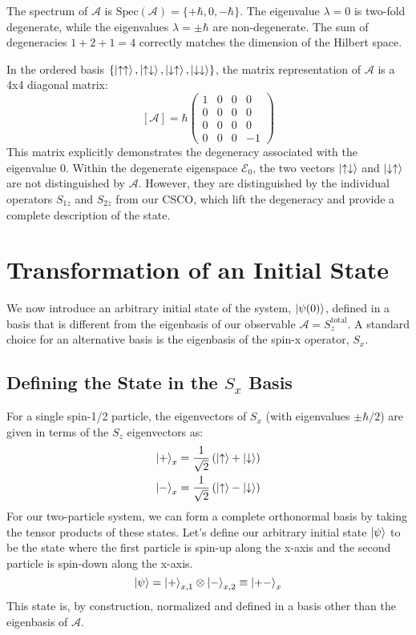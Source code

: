 \documentclass[11pt,a4paper]{article}
\begin{document}
The spectrum of $\mathcal{A}$ is $\text{Spec}(\mathcal{A}) = \{+\hbar, 0, -\hbar\}$. The eigenvalue $\lambda=0$ is two-fold degenerate, while the eigenvalues $\lambda=\pm\hbar$ are non-degenerate. The sum of degeneracies $1+2+1=4$ correctly matches the dimension of the Hilbert space.

In the ordered basis $\{\ket{\uparrow\uparrow}, \ket{\uparrow\downarrow}, \ket{\downarrow\uparrow}, \ket{\downarrow\downarrow}\}$, the matrix representation of $\mathcal{A}$ is a 4x4 diagonal matrix:
$$
[\mathcal{A}] = \hbar
\begin{pmatrix}
 1 & 0 & 0 & 0 \\
 0 & 0 & 0 & 0 \\
 0 & 0 & 0 & 0 \\
 0 & 0 & 0 & -1
\end{pmatrix}
$$
This matrix explicitly demonstrates the degeneracy associated with the eigenvalue 0. Within the degenerate eigenspace $\mathcal{E}_0$, the two vectors $\ket{\uparrow\downarrow}$ and $\ket{\downarrow\uparrow}$ are not distinguished by $\mathcal{A}$. However, they are distinguished by the individual operators $S_{1z}$ and $S_{2z}$ from our CSCO, which lift the degeneracy and provide a complete description of the state.

\section{Transformation of an Initial State}

We now introduce an arbitrary initial state of the system, $\ket{\psi(0)}$, defined in a basis that is different from the eigenbasis of our observable $\mathcal{A} = S_{z}^{\text{total}}$. A standard choice for an alternative basis is the eigenbasis of the spin-x operator, $S_x$.

\subsection{Defining the State in the $S_x$ Basis}

For a single spin-1/2 particle, the eigenvectors of $S_x$ (with eigenvalues $\pm\hbar/2$) are given in terms of the $S_z$ eigenvectors as:
\begin{align}
    \ket{+}_x &= \frac{1}{\sqrt{2}} \left( \ket{\uparrow} + \ket{\downarrow} \right) \\
    \ket{-}_x &= \frac{1}{\sqrt{2}} \left( \ket{\uparrow} - \ket{\downarrow} \right)
\end{align}
For our two-particle system, we can form a complete orthonormal basis by taking the tensor products of these states. Let's define our arbitrary initial state $\ket{\psi}$ to be the state where the first particle is spin-up along the x-axis and the second particle is spin-down along the x-axis.
\begin{equation}
    \ket{\psi} = \ket{+}_{x,1} \otimes \ket{-}_{x,2} \equiv \ket{+-}_x
\end{equation}
This state is, by construction, normalized and defined in a basis other than the eigenbasis of $\mathcal{A}$.
\end{document}
